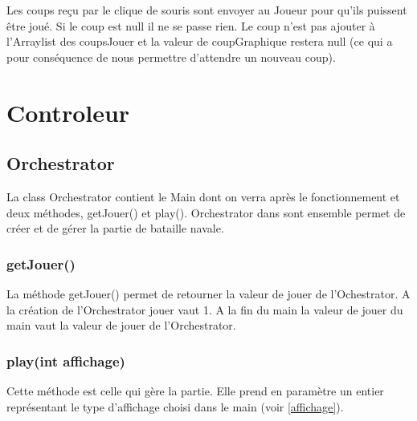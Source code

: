 \documentclass[a4paper,12pt]{article} %
\begin{document}
Les coups reçu par le clique de souris sont envoyer au Joueur pour qu'ils puissent être joué. Si le coup est null il ne se passe rien. Le coup n'est pas ajouter à l'Arraylist des coupsJouer et la valeur de coupGraphique restera null (ce qui a pour conséquence  de nous permettre d'attendre un nouveau coup). 

\section{Controleur}

\subsection{Orchestrator}
La class Orchestrator contient le Main dont on verra après le fonctionnement et deux méthodes, getJouer() et play(). Orchestrator dans sont ensemble permet de créer et de gérer la partie de bataille navale.
\subsubsection{getJouer()}
La méthode getJouer() permet de retourner la valeur de jouer de l'Ochestrator. A la création de l'Orchestrator jouer vaut 1. A la fin du main la valeur de jouer du main vaut la valeur de jouer de l'Orchestrator.
\subsubsection{play(int affichage)}
Cette méthode est celle qui gère la partie. Elle prend en paramètre un entier représentant le type d'affichage choisi dans le main (voir \ref{affichage}).
\newline
\end{document}
